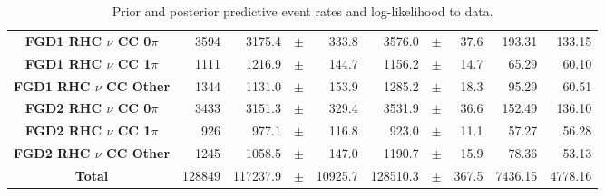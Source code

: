 \begin{center}
\begin{table}
\begin{adjustbox}{max width=1.1\textwidth,center}
\begin{tabular}{S||
	  			r|
                r
                p{0.26cm}
                r
                |r
                p{0.26cm}
                r
                |r
                r}
\textbf{FGD1 RHC $\nu$ CC 0$\pi$} & 3594 & 3175.4 & $\pm$ & 333.8 & 3576.0 & $\pm$ & 37.6 & 193.31 & 133.15\\
\textbf{FGD1 RHC $\nu$ CC 1$\pi$} & 1111 & 1216.9 & $\pm$ & 144.7 & 1156.2 & $\pm$ & 14.7 & 65.29 & 60.10\\
\textbf{FGD1 RHC $\nu$ CC Other} & 1344 & 1131.0 & $\pm$ & 153.9 & 1285.2 & $\pm$ & 18.3 & 95.29 & 60.51\\ \hline
\textbf{FGD2 RHC $\nu$ CC 0$\pi$} & 3433 & 3151.3 & $\pm$ & 329.4 & 3531.9 & $\pm$ & 36.6 & 152.49 & 136.10\\
\textbf{FGD2 RHC $\nu$ CC 1$\pi$} & 926 & 977.1 & $\pm$ & 116.8 & 923.0 & $\pm$ & 11.1 & 57.27 & 56.28\\
\textbf{FGD2 RHC $\nu$ CC Other} & 1245 & 1058.5 & $\pm$ & 147.0 & 1190.7 & $\pm$ & 15.9 & 78.36 & 53.13 \\ \hline
\textbf{Total} & 128849 & 117237.9 & $\pm$ & 10925.7 & 128510.3 & $\pm$ & 367.5 & 7436.15 & 4778.16 \\ \hline\hline
\end{tabular}
\end{adjustbox}
\caption{Prior and posterior predictive event rates and log-likelihood to data.}
\label{tab:predrates}
\end{table}
\end{center}

